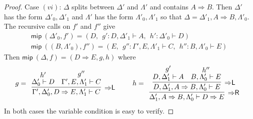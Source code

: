 \documentclass[a4paper,UKenglish,cleveref,autoref,thm-restate, anonymous]{lipics-v2021}
\newcommand{\proofbox}[1]{\begin{array}{c} #1 \end{array}}
\newcommand{\Rarr}{\Rightarrow}
\newcommand{\mf}[1]{\mathsf{#1}}
\newcommand{\vars}[1]{\mf{var} (#1)}
\newcommand{\GG}{\Gamma}
\newcommand{\GD}{\Delta}
\newcommand{\GL}{\Lambda}
\newcommand{\MIP}{\textsf{MIP}}
\newcommand{\vd}{\vdash}
\newcommand{\Rl}{{\Rarr}\mathsf{L}}
\newcommand{\Rr}{{\Rarr}\mathsf{R}}
\newcommand{\niccolo}[1]{\textcolor{red}{NV: #1}}
\begin{document}
\begin{proof}
  Case $(vi)$: $\GD$ splits between $\GD'$ and $\GL'$ and contains $A \Rarr B$. Then $\GD'$ has the form $\GD'_0 , \GD'_1$ and $\GL'$ has the form $\GL'_0 , \GL'_1$ so that $\GD = \GD'_1 , A \Rarr B , \GL'_0$.
  The recursive calls on $f'$ and $f''$ give
  \[
  \begin{array}{l}
  \mf{mip}\ (\GD'_0,f') = (D, \ \ g' : D , \GD'_1 \vd A, \ \ h' : \GD'_0 \vd D)
  \\
  \mf{mip}\ ((B,\GL'_0),f'') = (E,\ \ g'' : \GG' , E , \GL'_1 \vd C, \ \ h'' : B , \GL'_0 \vd E)
  \end{array}
  \]
  Then $\mf{mip}\ (\GD,f) = (D \Rarr E ,g, h)$ where
    \begin{equation}\label{case6}
    \begin{array}{c}
      g = \proofbox{
        \infer[\Rl]{\GG' , \GD'_0 , D \Rarr E , \GL'_1 \vd C}{
          \deduce{\GD'_0 \vd D}{h'}
          &
          \deduce{\GG' , E , \GL'_1 \vd C}{g''}
        }
      }
      \qquad
      h = \proofbox{
        \infer[\Rr]{\GD'_1 , A \Rarr B , \GL'_0 \vd D \Rarr E}{
          \infer[\Rl]{D , \GD'_1 , A \Rarr B , \GL'_0 \vd E}{
            \deduce{D , \GD'_1 \vd A}{g'}
            &
            \deduce{B , \GL'_0 \vd E}{h''}
          }
        }
      }
    \end{array}
    \end{equation}
    In both cases the variable condition is easy to verify.
\end{proof}
\end{document}
